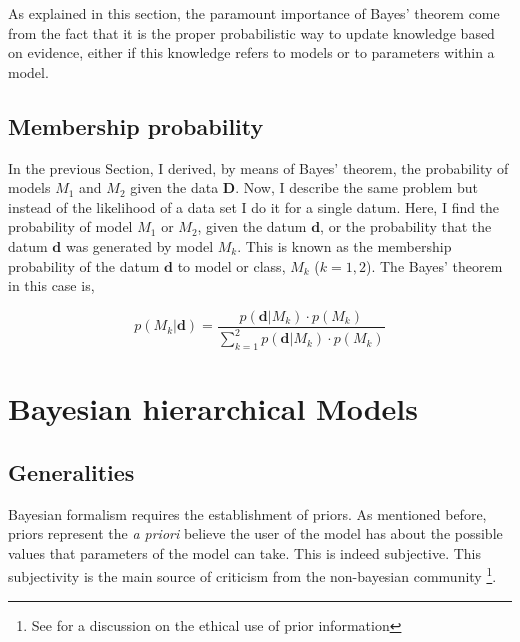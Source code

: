As explained in this section, the paramount importance of Bayes' theorem come from the fact that it is the proper probabilistic way to update knowledge based on evidence, either if this knowledge refers to models or to parameters within a model.

\subsection{Membership probability}

In the previous Section, I derived, by means of Bayes' theorem, the probability of models $M_1$ and $M_2$ given the data $\mathbf{D}$. Now, I describe the same problem but instead of the likelihood of a data set I do it for a single datum. Here, I find the probability of model $M_1$ or $M_2$, given the datum $\mathbf{d}$, or the probability that the datum $\mathbf{d}$ was generated by model $M_k$. This is known as the membership probability of the datum $\mathbf{d}$ to model or class, $M_k$ ($k=1,2$). The Bayes' theorem in this case is,

\begin{equation}
\label{eq:prob}
p( M_k | \mathbf{d}) =\frac{p(\mathbf{d}|M_k)\cdot p(M_k)}{\sum_{k=1}^2 p(\mathbf{d}|M_k)\cdot p(M_k)} 
\end{equation}


\section{Bayesian hierarchical Models}
\subsection{Generalities}
Bayesian formalism requires the establishment of priors. As mentioned before, priors represent the \emph{a priori} believe the user of the model has about the possible values that parameters of the model can take. This is indeed subjective. This subjectivity is the main source of criticism from the non-bayesian community \footnote{See \citet{Gelman2012} for a discussion on the ethical use of prior information}. 

